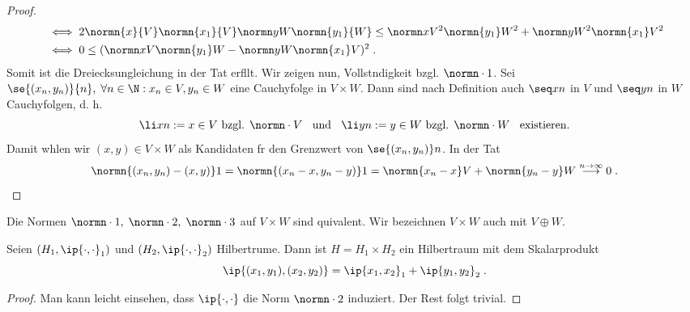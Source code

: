 \begin{proof}
\begin{align*}
	&\iff 2 \normn{x}{V}\normn{x_1}{V} \normn yW \normn{y_1}{W} \leq \normn xV^2 \normn{y_1}W^2 + \normn yW^2 \normn{x_1}V^2\\ 
	&\iff 0 \leq  (\normn xV \normn{y_1}W - \normn yW \normn{x_1}V)^2\;.
	\end{align*}
	Somit ist die Dreiecksungleichung in der Tat erf\us llt. Wir zeigen nun, Vollst\as ndigkeit bzgl. \(\normn\cdot 1\). Sei \(\se{(x_n, y_n)}{n},
	\; \forall n\in \N: x_n \in V, y_n \in W\) eine Cauchyfolge in \(V\times W\). Dann sind nach Definition auch \(\seq xn\) in $V$ und \(\seq yn\) in $W$ Cauchyfolgen, d. h. 
	\[\li xn := x \in V\text{ bzgl. } \normn\cdot V \;\;\text{ und }\;\;\li yn := y \in W\text{ bzgl. } \normn\cdot W \;\;\text{ existieren.}\]
	Damit w\as hlen wir \((x,y) \in V\times W\) als Kandidaten f\us r den Grenzwert von \(\se{(x_n, y_n)}n\). In der Tat
	\[\normn{(x_n, y_n) - (x,y)}1 = \normn{(x_n - x, y_n -y)}1 = \normn{x_n -x}V + \normn{y_n - y}W \overset{n\to\infty}{\longrightarrow} 0 \;.\]
\end{proof}
\begin{rem}
	Die Normen \(\normn\cdot 1,\;\normn\cdot 2,\; \normn\cdot 3\) auf \(V\times W\) sind 
	\as quivalent. Wir bezeichnen \(V\times W\) auch mit \(V\oplus W\).
\end{rem}

\begin{theorem}
	Seien \((H_1, \ip{\cdot, \cdot}_1)\) und \((H_2, \ip{\cdot, \cdot}_2)\) Hilbertr\as ume. 
	Dann ist \(H = H_1 \times H_2\) ein Hilbertraum mit dem Skalarprodukt
	\[\ip{(x_1,y_1), (x_2,y_2)} = \ip{x_1,x_2}_1 + \ip{y_1,y_2}_2\;.\]
\end{theorem}
\begin{proof}
	\happybegin
	Man kann leicht einsehen, dass \(\ip{\cdot,\cdot}\) die Norm \(\normn\cdot 2 \) induziert. Der Rest folgt trivial.\happyend
\end{proof}

